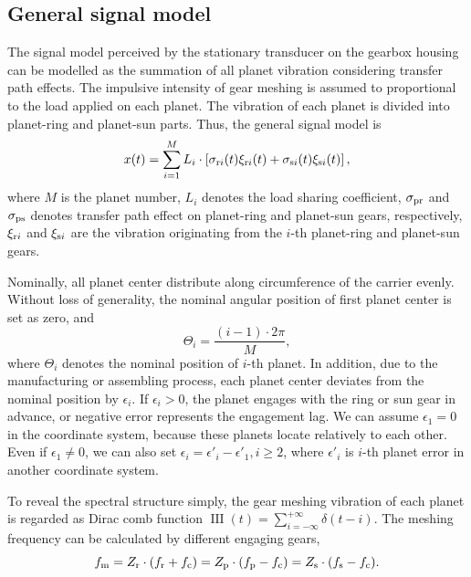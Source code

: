 \documentclass[a4paper,fleqn]{cas-sc}%
\begin{document}
\subsection{General signal model}
\par The signal model perceived by the stationary transducer on the gearbox housing can be modelled as the summation of all planet vibration considering transfer path effects. The impulsive intensity of gear meshing is assumed to proportional to the load applied on each planet. The vibration of each planet is divided into planet-ring and planet-sun parts. Thus, the general signal model is
\begin{equation}
    x(t)=\sum_{i=1}^{M} L_i \cdot \left[ \sigma_{{\rm r}i}(t) \xi_{{\rm r}i}(t) + \sigma_{{\rm s}i}(t) \xi_{{\rm s}i}(t) \right], \label{eq:general_signal}
\end{equation}
where $M$ is the planet number, $L_i$ denotes the load sharing coefficient, $\sigma_{\rm pr}$ and $\sigma_{\rm ps}$ denotes transfer path effect on planet-ring and planet-sun gears, respectively, $\xi_{{\rm r}i}$ and $\xi_{{\rm s}i}$ are the vibration originating from the $i$-th planet-ring and planet-sun gears.
\par Nominally, all planet center distribute along circumference of the carrier evenly. Without loss of generality, the nominal angular position of first planet center is set as zero, and
\begin{equation}
    \Theta_i=\frac{(i-1)\cdot 2\pi}{M},
\end{equation}
where $\Theta_i$ denotes the nominal position of $i$-th planet. In addition, due to the manufacturing or assembling process, each planet center deviates from the nominal position by $\epsilon_i$. If $\epsilon_i>0$, the planet engages with the ring or sun gear in advance, or negative error represents the engagement lag. We can assume $\epsilon_1=0$ in the coordinate system, because these planets locate relatively to each other. Even if $\epsilon_1 \neq 0$, we can also set $\epsilon_i=\epsilon'_i-\epsilon'_1,i \geq 2$, where $\epsilon'_i$ is $i$-th planet error in another coordinate system.
\par To reveal the spectral structure simply, the gear meshing vibration of each planet is regarded as Dirac comb function $\operatorname{III}(t)=\sum_{i=-\infty}^{+\infty}\delta(t-i)$. The meshing frequency can be calculated by different engaging gears,
\begin{equation}
    f_{\rm m}=Z_{\rm r} \cdot (f_{\rm r}+f_{\rm c})=Z_{\rm p} \cdot (f_{\rm p}-f_{\rm c})=Z_{\rm s} \cdot (f_{\rm s}-f_{\rm c}). \label{eq:meshing_frequency}
\end{equation}
\end{document}
